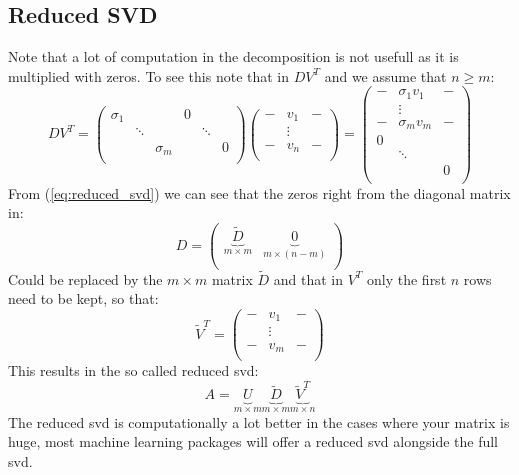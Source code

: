 \subsection{Reduced SVD}
Note that a lot of computation in the decomposition is not usefull as it is multiplied with zeros. To see this note that in $DV^T$ and we assume that $n\geq m$:
\begin{equation}
\label{eq:reduced_svd}
DV^T = 
\begin{pmatrix}
\sigma_1 & & & 0 & & \\
& \ddots & & & \ddots & \\
&&\sigma_m & & & 0\\
\end{pmatrix}
\begin{pmatrix}
- & v_1 & -\\
& \vdots &\\
- & v_n & -\\
\end{pmatrix}=
\begin{pmatrix}
- & \sigma_1v_1 & -\\
& \vdots &\\
- & \sigma_m v_m & -\\
0 & &\\
&\ddots&\\
 & & 0\\
\end{pmatrix}
\end{equation}
From (\ref{eq:reduced_svd}) we can see that the zeros right from the diagonal matrix in:
\begin{equation}
D = 
\begin{pmatrix}
\underbrace{\tilde{D}}_{m\times m} & \underbrace{0}_{m\times (n-m)}\\
\end{pmatrix}
\end{equation}
Could be replaced by the $m\times m$ matrix $\tilde{D}$ and that in $V^T$ only the first $n$ rows need to be kept, so that:
\begin{equation}
\tilde{V}^T = \begin{pmatrix}
- & v_1 & -\\
& \vdots &\\
- & v_m & -\\
\end{pmatrix}
\end{equation} This results in the so called reduced svd:
\begin{equation}
A = \underbrace{U}_{m\times m} \underbrace{\tilde{D}}_{m \times m} \underbrace{\tilde{V}^T}_{m\times n}
\end{equation}
The reduced svd is computationally a lot better in the cases where your matrix is huge, most machine learning packages will offer a reduced svd alongside the full svd.

